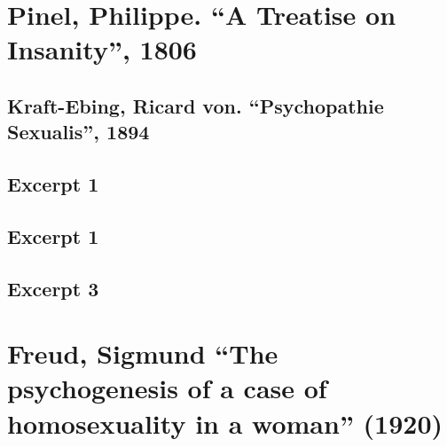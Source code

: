 \begin{appendices}
\let\svaddcontentsline\addcontentsline
\renewcommand\addcontentsline[3]{%
  \ifthenelse{\equal{#1}{lof}}{}%
  {\ifthenelse{\equal{#1}{lot}}{}{\svaddcontentsline{#1}{#2}{#3}}}}



\chapter{Pinel, Philippe. “A Treatise on Insanity”, 1806}
\label{pinelphilippe.“atreatiseoninsanity”1806}

\label{app: Pinel}


\section{Kraft-Ebing, Ricard von. ``Psychopathie Sexualis'', 1894}
\label{kraft-ebingricardvon.psychopathiesexualis1894}

\section{Excerpt 1}
\label{excerpt1}

\label{app: KraftEbbing1}


\section{Excerpt 1}
\label{excerpt1}

\label{app: KraftEbbing2}


\section{Excerpt 3}
\label{excerpt3}

\label{app: KraftEbbing3}


\chapter{Freud, Sigmund “The psychogenesis of a case of homosexuality in a woman” (1920)}
\label{freudsigmund“thepsychogenesisofacaseofhomosexualityinawoman”1920}


\end{appendices}
